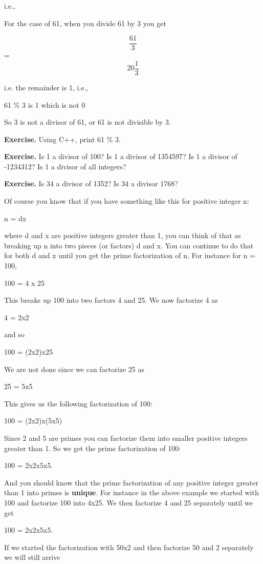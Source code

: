\documentclass[
]{article}
\begin{document}
i.e.,

For the case of 61, when you divide 61 by 3 you get

\[\frac{61}{3}\] = \[20\frac{1}{3}\]

i.e. the remainder is 1, i.e.,

61 \% 3 is 1 which is not 0

So 3 is not a divisor of 61, or 61 is not divisible by 3.

\textbf{Exercise.} Using C++, print 61 \% 3.

\textbf{Exercise.} Is 1 a divisor of 100? Is 1 a divisor of 1354597? Is
1 a divisor of -1234312? Is 1 a divisor of all integers?

\textbf{Exercise.} Is 34 a divisor of 1352? Is 34 a divisor 1768?

Of course you know that if you have something like this for positive
integer n:

n = dx

where d and x are positive integers greater than 1, you can think of
that as breaking up n into two pieces (or factors) d and x. You can
continue to do that for both d and x until you get the prime
factorization of n. For instance for n = 100,

100 = 4 x 25

This breaks up 100 into two factors 4 and 25. We now factorize 4 as

4 = 2x2

and so

100 = (2x2)x25

We are not done since we can factorize 25 as

25 = 5x5

This gives us the following factorization of 100:

100 = (2x2)x(5x5)

Since 2 and 5 are primes you can factorize them into smaller positive
integers greater than 1. So we get the prime factorization of 100:

100 = 2x2x5x5.

And you should know that the prime factorization of any positive integer
greater than 1 into primes is \textbf{unique}. For instance in the above
example we started with 100 and factorize 100 into 4x25. We then
factorize 4 and 25 separately until we get

100 = 2x2x5x5.

If we started the factorization with 50x2 and then factorize 50 and 2
separately we will still arrive
\end{document}
